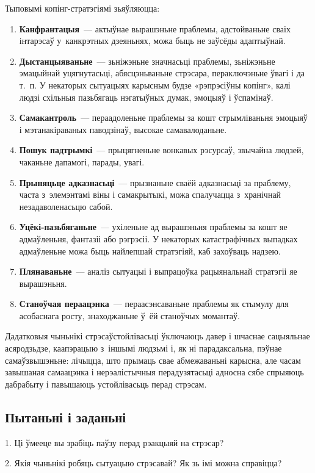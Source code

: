 Тыповымі копінг-стратэгіямі зьяўляюцца:
\begin{enumerate}
  \item \textbf{Канфрантацыя}~--- актыўнае вырашэньне праблемы, адстойваньне сваіх інтарэсаў у~канкрэтных дзеяньнях, можа быць не заўсёды адаптыўнай.
  \item \textbf{Дыстанцыяваньне}~--- зьніжэньне значнасьці праблемы, зьніжэньне эмацыйнай уцягнутасьці, абясцэньваньне стрэсара, пераключэньне ўвагі і да т.~п. У некаторых сытуацыях карысным будзе «рэпрэсіўны копінг», калі людзі схільныя пазьбягаць нэгатыўных думак, эмоцыяў і ўспамінаў.
  \item \textbf{Самакантроль}~--- пераадоленьне праблемы за кошт стрымліваньня эмоцыяў і мэтанакіраваных паводзінаў, высокае самавалоданьне.
  \item \textbf{Пошук падтрымкі}~--- прыцягненьне вонкавых рэсурсаў, звычайна людзей, чаканьне дапамогі, парады, увагі.
  \item \textbf{Прыняцьце адказнасьці}~--- прызнаньне сваёй адказнасьці за праблему, часта з~элемэнтамі віны і самакрытыкі, можа спалучацца з~хранічнай незадаволенасьцю сабой.
  \item \textbf{Уцёкі-пазьбяганьне}~--- ухіленьне ад вырашэньня праблемы за кошт яе адмаўленьня, фантазіі або рэгрэсіі. У некаторых катастрафічных выпадках адмаўленьне можа быць найлепшай стратэгіяй, каб захоўваць надзею.
  \item \textbf{Плянаваньне}~--- аналіз сытуацыі і выпрацоўка рацыянальнай стратэгіі яе вырашэньня.
  \item \textbf{Станоўчая пераацэнка}~--- пераасэнсаваньне праблемы як стымулу для асобаснага росту, знаходжаньне ў~ёй станоўчых момантаў.
\end{enumerate}

Дадатковыя чыньнікі стрэсаўстойлівасьці ўключаюць давер і шчаснае сацыяльнае асяродзьдзе, каапэрацыю з~іншымі людзьмі і, як ні парадаксальна, пэўнае самаўзвышэньне: лічыцца, што прымаць свае абмежаваньні карысна, але часам завышаная самаацэнка і нерэалістычныя перадузятасьці адносна сябе спрыяюць дабрабыту і павышаюць устойлівасьць перад стрэсам.

\subsection*{Пытаньні і заданьні}

1. Ці ўмееце вы зрабіць паўзу перад рэакцыяй на стрэсар?

2. Якія чыньнікі робяць сытуацыю стрэсавай? Як зь імі можна справіцца?

